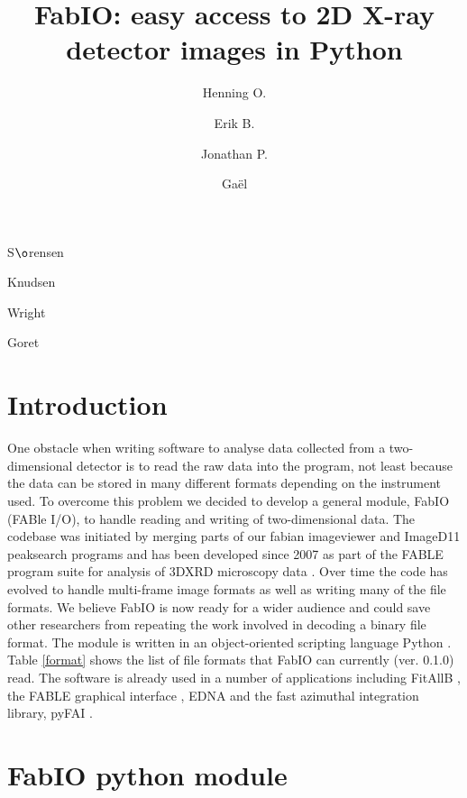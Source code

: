 \documentclass{iucr}
\begin{document}
\title{FabIO: easy access to 2D X-ray detector images in Python}

    \author[a]{Henning O.}{S$\o$rensen}
    \author[b]{Erik B.}{Knudsen}
    \author[c]{Jonathan P.}{Wright}
	\author[c]{Ga\"el}{Goret}

\maketitle

\section{Introduction}

One obstacle when writing software to analyse data collected from a
two-dimensional detector is to read the raw data into the program,
not least because the data can be stored in many different formats
depending on the instrument used.
To overcome this problem we decided to develop a general module,
FabIO (FABle I/O), to handle reading and writing of two-dimensional
data.
The codebase was initiated by merging parts of our fabian imageviewer
\cite{fabian} and ImageD11 \cite{ImageD11} peaksearch programs and has
been developed since 2007 as part of the FABLE \cite{fable} program suite
for analysis of 3DXRD microscopy data \cite{3dxrd}.
Over time the code has evolved to handle multi-frame image formats
as well as writing many of the file formats.
We believe FabIO is now ready for a wider audience and could save other
researchers from repeating the work involved in decoding a
binary file format.
The module is written in an object-oriented scripting language Python
\cite{python}.
Table \ref{format} shows the list of file formats that FabIO
can currently (ver. 0.1.0) read.
The software is already used in a number of applications including
FitAllB \cite{fitallb}, the FABLE graphical interface \cite{fable}, EDNA \cite{edna}
and the fast azimuthal integration library, pyFAI \cite{pyfai}.


\section{FabIO python module}
\end{document}
